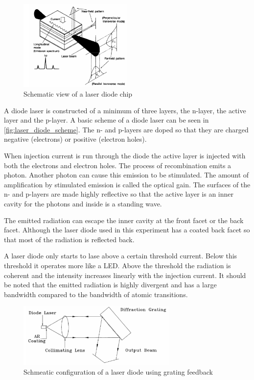 \begin{figure}
    \centering
    \includegraphics[width=0.5\textwidth]{images/laser_diode_scheme.png}
    \caption{Schematic view of a laser diode chip \cite{V60}}
    \label{fig:laser_diode_scheme}
\end{figure}

A diode laser is constructed of a minimum of three layers, the n-layer, the active layer and the p-layer.
A basic scheme of a diode laser can be seen in \autoref{fig:laser_diode_scheme}.
The n- and p-layers are doped so that they are charged negative (electrons) or positive (electron holes).

When injection current is run through the diode the active layer is injected with both the electrons and electron holes.
The process of recombination emits a photon. 
Another photon can cause this emission to be stimulated.
The amount of amplification by stimulated emission is called the optical gain.
The surfaces of the n- and p-layers are made highly reflective so that the active layer is an inner cavity for the photons and inside is a standing wave.

The emitted radiation can escape the inner cavity at the front facet or the back facet.
Although the laser diode used in this experiment has a coated back facet so that most of the radiation is reflected back.

A laser diode only starts to lase above a certain threshold current. 
Below this threshold it operates more like a LED.
Above the threshold the radiation is coherent and the intensity increases linearly with the injection current.
It should be noted that the emitted radiation is highly divergent and has a large bandwidth compared to the bandwidth of atomic transitions.

\begin{figure}
    \centering
    \includegraphics[width=0.7\textwidth]{images/grating_feedback_scheme.png}
    \caption{Schmeatic configuration of a laser diode using grating feedback \cite{V60}}
    \label{fig:grating_feedback_scheme}
\end{figure}

